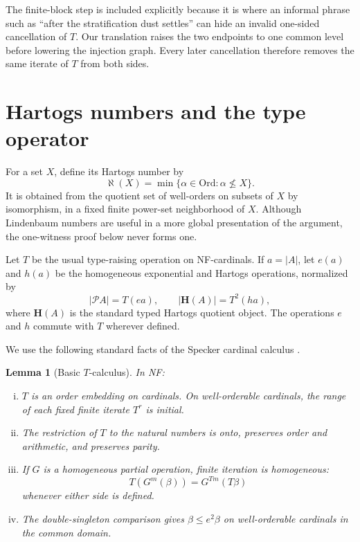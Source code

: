 \documentclass[11pt]{article}
\newtheorem{lemma}[theorem]{Lemma}
\numberwithin{equation}{section}
\theoremstyle{definition}
\theoremstyle{remark}
\newcommand{\Pow}{\mathcal P}
\newcommand{\Ord}{\mathrm{Ord}}
\begin{document}
The finite-block step is included explicitly because it is where an
informal phrase such as ``after the stratification dust settles'' can hide
an invalid one-sided cancellation of $T$.  Our translation raises the two
endpoints to one common level before lowering the injection graph.  Every
later cancellation therefore removes the same iterate of $T$ from both
sides.

\section{Hartogs numbers and the type operator}

For a set $X$, define its Hartogs number by
\[
 \aleph(X)=\min\{\alpha\in\Ord:\alpha\not\leq X\}.
\]
It is obtained from the quotient set of well-orders on subsets of $X$ by
isomorphism, in a fixed finite power-set neighborhood of $X$.  Although
Lindenbaum numbers are useful in a more global presentation of the
argument, the one-witness proof below never forms one.

Let $T$ be the usual type-raising operation on NF-cardinals.  If
$a=|A|$, let $e(a)$ and $h(a)$ be the homogeneous exponential and
Hartogs operations, normalized by
\begin{equation}
 |\Pow A|=T(ea),
 \qquad
 |\mathbf H(A)|=T^2(ha),
 \label{eq:normalization}
\end{equation}
where $\mathbf H(A)$ is the standard typed Hartogs quotient object.
The operations $e$ and $h$ commute with $T$ wherever defined.

We use the following standard facts of the Specker cardinal calculus
\cite{Specker,Forster,HolmesBook}.

\begin{lemma}[Basic $T$-calculus]\label{lem:t-calculus}
In NF:
\begin{enumerate}[(i)]
\item $T$ is an order embedding on cardinals.  On well-orderable
      cardinals, the range of each fixed finite iterate $T^r$ is initial.
\item The restriction of $T$ to the natural numbers is onto, preserves
      order and arithmetic, and preserves parity.
\item If $G$ is a homogeneous partial operation, finite iteration is
      homogeneous:
      \[
       T(G^m(\beta))=G^{Tm}(T\beta)
      \]
      whenever either side is defined.
\item The double-singleton comparison gives $\beta\leq e^2\beta$ on
      well-orderable cardinals in the common domain.
\end{enumerate}
\end{lemma}
\end{document}
